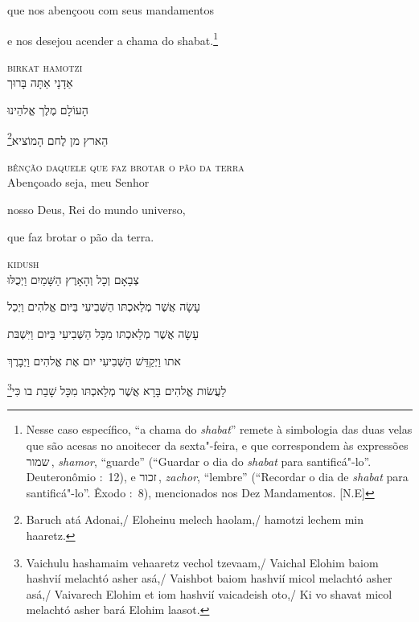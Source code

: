 que nos abençoou com seus mandamentos\label{ref01}

e nos desejou acender a chama do shabat.\footnote{Nesse caso 
	específico, ``a chama do \textit{shabat}'' remete à simbologia das duas velas
	que são acesas no anoitecer da sexta"-feira, e que correspondem às
	expressões שמור\,, \emph{shamor}, ``guarde'' (``Guardar o dia do
	\emph{shabat} para santificá"-lo''. Deuteronômio :~12),
	e זכור\,, \emph{zachor}, ``lembre''
	(``Recordar o dia de \emph{shabat} para santificá"-lo''. Êxodo
	:~8), mencionados nos Dez Mandamentos. [N.E]}

\movetoevenpage
\raggedleft



\textsc{birkat hamotzi}\\[15pt]

אַדָנָי אַתָּה בָּרוּך

הָעוֹלָם מֶלֶך אֱלהֵינוּ 

\footnote{Baruch atá Adonai,/ Eloheinu melech haolam,/ hamotzi lechem min haaretz.}הַארץ מן לֶחם הָמוֹציא

\movetooddpage
\raggedright


\textsc{bênção daquele que faz brotar o pão da terra}\\[15pt]

Abençoado seja, meu Senhor

nosso Deus, Rei do mundo universo,

que faz brotar o pão da terra.


\movetoevenpage
\raggedleft



\textsc{kidush}\\[15pt]

צְבָאָם וְכָל וְהָאָרֶץ הַשָּׁמַיִם וַיְכֻלּוּ 

עָשָׂה אֲשֶׁר מְלַאכְתּו הַשְּׁבִיעִי בַּיּום אֱלהִים וַיְכַל 

עָשָׂה אֲשֶׁר מְלַאכְתּו מִכָּל הַשְּׁבִיעִי בַּיּום וַיִּשְׁבּת 

אתו וַיְקַדֵּשׁ הַשְּׁבִיעִי יום אֶת אֱלהִים וַיְבָרֶךְ 

\footnote{Vaichulu hashamaim vehaaretz vechol tzevaam,/
Vaichal Elohim baiom hashvií melachtó asher asá,/
Vaishbot baiom hashvií micol melachtó asher asá,/
Vaivarech Elohim et iom hashvií vaicadeish oto,/
Ki vo shavat micol melachtó asher bará Elohim laasot.}לַעֲשׂות אֱלהִים בָּרָא אֲשֶׁר מְלַאכְתּו מִכָּל שָׁבַת בו כִּי\\[10pt] 

